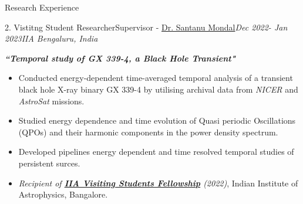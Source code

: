 \begin{section}{Research Experience}
    \vspace{-0.5em}


    \begin{subsectionnobullet1}{2. Vistitng Student Researcher}{Supervisor - \href{https://www.iiap.res.in/people/profile/academic/santanu-mondal/}{Dr. Santanu Mondal}}{\textit{Dec 2022- Jan 2023}}{\textit{IIA Bengaluru, India}}{}
        \vspace{-0.5em}

        \textbf{\textit{``Temporal study of GX 339-4, a Black Hole Transient"}}
        \vspace{-0.5em}
        \begin{itemize}
            \item Conducted energy-dependent time-averaged temporal analysis of a transient black hole X-ray binary GX 339-4 by utilising archival data from \textit{NICER} and \textit{AstroSat} missions.
            \vspace{-0.5em}
            \item Studied energy dependence and time evolution of Quasi periodic Oscillations (QPOs) and their harmonic components in the power density spectrum. 
            \vspace{-0.5em}
            \item Developed pipelines energy dependent and time resolved temporal studies of persistent surces. 
            \vspace{-0.5em}
            \item \textit{Recipient of \textbf{\href{https://www.iiap.res.in/opportunities/visiting-students/internships/}{IIA Visiting Students Fellowship}} (2022)}, Indian Institute of Astrophysics, Bangalore.
        \end{itemize}

    \end{subsectionnobullet1}
    

\end{section}
